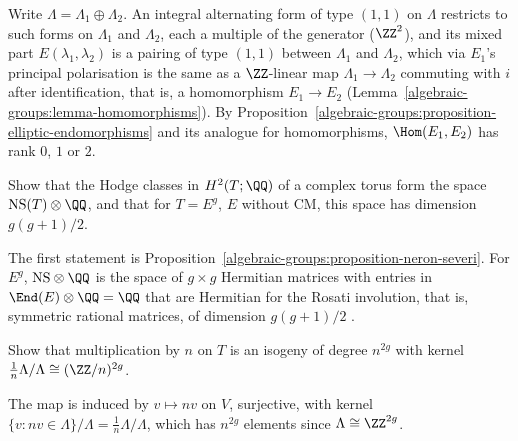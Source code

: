 \begin{solution}
Write $\Lambda = \Lambda_1 \oplus \Lambda_2$. An integral alternating form of type $(1,1)$ on $\Lambda$ restricts to such forms on $\Lambda_1$ and $\Lambda_2$, each a multiple of the generator
($\ZZ^2$), and its mixed part $E(\lambda_1, \lambda_2)$ is a pairing of type $(1,1)$ between $\Lambda_1$ and $\Lambda_2$, which via $E_1$'s principal polarisation is the same as a
$\ZZ$-linear map $\Lambda_1 \to \Lambda_2$ commuting with $i$ after identification, that is, a homomorphism $E_1 \to E_2$ (Lemma~\ref{algebraic-groups:lemma-homomorphisms}). By
Proposition~\ref{algebraic-groups:proposition-elliptic-endomorphisms} and its analogue for homomorphisms, $\Hom(E_1, E_2)$ has rank $0$, $1$ or $2$.
\end{solution}

\begin{exercise}\label{algebraic-groups:exercise-hodge-classes-torus}
Show that the Hodge classes in $H^2(T; \QQ)$ of a complex torus form the space $\mathrm{NS}(T) \otimes \QQ$, and that for $T = E^g$, $E$ without CM, this space has dimension
$g(g + 1)/2$.
\end{exercise}

\begin{solution}
The first statement is Proposition~\ref{algebraic-groups:proposition-neron-severi}. For $E^g$, $\mathrm{NS} \otimes \QQ$ is the space of $g \times g$ Hermitian matrices with entries in
$\End(E) \otimes \QQ = \QQ$ that are Hermitian for the Rosati involution, that is, symmetric rational matrices, of dimension $g(g + 1)/2$ \cite{birkenhake-lange}.
\end{solution}

\begin{exercise}\label{algebraic-groups:exercise-isogeny-dual}
Show that multiplication by $n$ on $T$ is an isogeny of degree $n^{2g}$ with kernel $\frac1n\Lambda/\Lambda \cong (\ZZ/n)^{2g}$.
\end{exercise}

\begin{solution}
The map is induced by $v \mapsto nv$ on $V$, surjective, with kernel $\{v : nv \in \Lambda\}/\Lambda = \frac1n\Lambda/\Lambda$, which has $n^{2g}$ elements since $\Lambda \cong \ZZ^{2g}$.
\end{solution}

